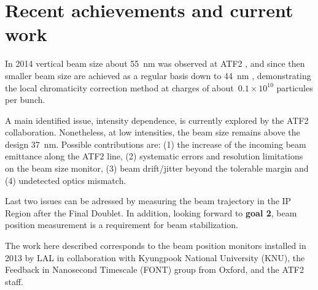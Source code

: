 {{\section{Recent achievements and current work}
In 2014 vertical beam size about 55~nm was observed at ATF2 \cite{Kubo50nm}, and since then smaller beam size are achieved as a regular basis down to 44~nm \cite{KuboCLICws2015}, demonstrating the local chromaticity correction method at charges of about~$0.1\times10^{10}$ particules per bunch.\par
A main identified issue, intensity dependence, is currently explored by the ATF2 collaboration. Nonetheless, at low intensities, the beam size remains above the design 37~nm. Possible contributions are: (1) the increase of the incoming beam emittance along the ATF2 line, (2) systematic errors and resolution limitations on the beam size monitor, (3) beam drift/jitter beyond the tolerable margin and  (4) undetected optics mismatch.\par
Last two issues can be adressed by measuring the beam trajectory in the IP Region after the Final Doublet. In addition, looking forward to \textbf{goal 2}, beam position measurement is a requirement for beam stabilization.\par
The work here described corresponds to the beam position monitors installed in 2013 by LAL in collaboration with Kyungpook National University (KNU), the Feedback in Nanosecond Timescale (FONT) group from Oxford, and the ATF2 staff.\par

}}
